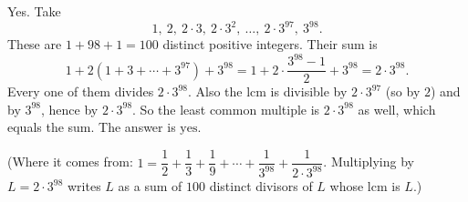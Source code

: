 Yes. Take
\[
1,\ 2,\ 2\cdot3,\ 2\cdot3^2,\ \dots,\ 2\cdot3^{97},\ 3^{98}.
\]
These are $1+98+1=100$ distinct positive integers. Their sum is
\[
1+2\left(1+3+\cdots+3^{97}\right)+3^{98}=1+2\cdot\dfrac{3^{98}-1}{2}+3^{98}=2\cdot3^{98}.
\]
Every one of them divides $2\cdot3^{98}$. Also the lcm is divisible by $2\cdot3^{97}$ (so by $2$) and by $3^{98}$, hence by $2\cdot3^{98}$. So the least common multiple is $2\cdot3^{98}$ as well, which equals the sum. The answer is $\boxed{\text{yes}}$.

(Where it comes from: $1=\dfrac{1}{2}+\dfrac{1}{3}+\dfrac{1}{9}+\cdots+\dfrac{1}{3^{98}}+\dfrac{1}{2\cdot3^{98}}$. Multiplying by $L=2\cdot3^{98}$ writes $L$ as a sum of $100$ distinct divisors of $L$ whose lcm is $L$.)
